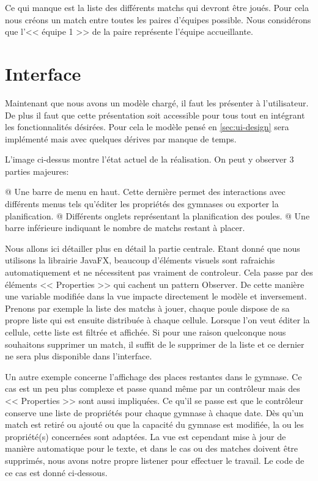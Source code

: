 \documentclass[final, noposter]{polytech/polytech}
\begin{document}
		Ce qui manque est la liste des différents matchs qui devront être joués.
		Pour cela nous créons un match entre toutes les paires d'équipes possible.
		Nous considérons que l'<< équipe 1 >> de la paire représente l'équipe accueillante.
	
	\section{Interface}
		Maintenant que nous avons un modèle chargé, il faut les présenter à l'utilisateur.
		De plus il faut que cette présentation soit accessible pour tous tout en intégrant les fonctionnalités désirées.
		Pour cela le modèle pensé en \autoref{sec:ui-design} sera implémenté mais avec quelques dérives par manque de temps.
		
		
		L'image ci-dessus montre l'état actuel de la réalisation.
		On peut y observer 3 parties majeures:
		\begin{easylist}[itemize]
			@ Une barre de menu en haut.
			Cette dernière permet des interactions avec différents menus tels qu'éditer les propriétés des gymnases ou exporter la planification.
			@ Différents onglets représentant la planification des poules.
			@ Une barre inférieure indiquant le nombre de matchs restant à placer.
		\end{easylist}
	
		Nous allons ici détailler plus en détail la partie centrale.
		Etant donné que nous utilisons la librairie JavaFX, beaucoup d'éléments visuels sont rafraichis automatiquement et ne nécessitent pas vraiment de controleur.
		Cela passe par des éléments << Properties >> qui cachent un pattern Observer.
		De cette manière une variable modifiée dans la vue impacte directement le modèle et inversement.
		Prenons par exemple la liste des matchs à jouer, chaque poule dispose de sa propre liste qui est ensuite distribuée à chaque cellule.
		Lorsque l'on veut éditer la cellule, cette liste est filtrée et affichée.
		Si pour une raison quelconque nous souhaitons supprimer un match, il suffit de le supprimer de la liste et ce dernier ne sera plus disponible dans l'interface.
		
		Un autre exemple concerne l'affichage des places restantes dans le gymnase.
		Ce cas est un peu plus complexe et passe quand même par un contrôleur mais des << Properties >> sont aussi impliquées.
		Ce qu'il se passe est que le contrôleur conserve une liste de propriétés pour chaque gymnase à chaque date.
		Dès qu'un match est retiré ou ajouté ou que la capacité du gymnase est modifiée, la ou les propriété(s) concernées sont adaptées.
		La vue est cependant mise à jour de manière automatique pour le texte, et dans le cas ou des matches doivent être supprimés, nous avons notre propre listener pour effectuer le travail.
		Le code de ce cas est donné ci-dessous.
		
\end{document}
